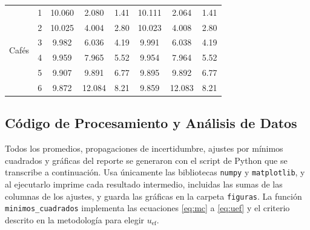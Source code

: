 \begin{table}[!htb]
\begin{tabular}{c c c c c c c c}
        \midrule
        \multirow{6}{*}{Cafés}
          & 1 & 10.060 & 2.080  & 1.41 & 10.111 & 2.064  & 1.41 \\
          & 2 & 10.025 & 4.004  & 2.80 & 10.023 & 4.008  & 2.80 \\
          & 3 & 9.982  & 6.036  & 4.19 & 9.991  & 6.038  & 4.19 \\
          & 4 & 9.959  & 7.965  & 5.52 & 9.954  & 7.964  & 5.52 \\
          & 5 & 9.907  & 9.891  & 6.77 & 9.895  & 9.892  & 6.77 \\
          & 6 & 9.872  & 12.084 & 8.21 & 9.859  & 12.083 & 8.21 \\
        \bottomrule
    \end{tabular}
\end{table}

\subsection{Código de Procesamiento y Análisis de Datos}

Todos los promedios, propagaciones de incertidumbre, ajustes por mínimos cuadrados y gráficas del reporte se generaron con el script de Python que se transcribe a continuación. Usa únicamente las bibliotecas \texttt{numpy} y \texttt{matplotlib}, y al ejecutarlo imprime cada resultado intermedio, incluidas las sumas de las columnas de los ajustes, y guarda las gráficas en la carpeta \texttt{figuras}. La función \texttt{minimos\_cuadrados} implementa las ecuaciones \eqref{eq:mc} a \eqref{eq:uef} y el criterio descrito en la metodología para elegir $u_{\mathrm{ef}}$.



